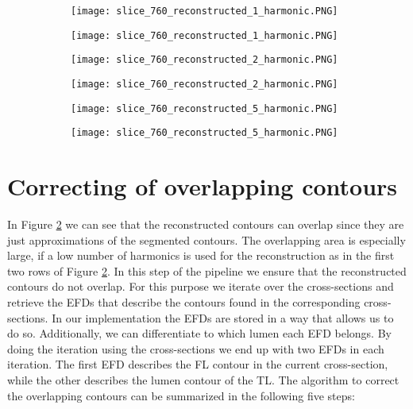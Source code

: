 \documentclass[thesis.tex]{subfiles}
\begin{document}
\begin{figure}
	\begin{subfigure}[t]{0.45\textwidth}
		\texttt{[image: slice\_760\_reconstructed\_1\_harmonic.PNG]}
	\caption{}
\label{fig:efds_reconstruction_a}		
	\end{subfigure}
\hspace{0.1\textwidth}
	\begin{subfigure}[t]{0.45\textwidth}
		\texttt{[image: slice\_760\_reconstructed\_1\_harmonic.PNG]}		
\caption{}	
	\end{subfigure}
	\begin{subfigure}[t]{0.45\textwidth}
		\texttt{[image: slice\_760\_reconstructed\_2\_harmonic.PNG]}
	\caption{}		
	\end{subfigure}
\hspace{0.1\textwidth}
	\begin{subfigure}[t]{0.45\textwidth}
		\texttt{[image: slice\_760\_reconstructed\_2\_harmonic.PNG]}		
\caption{}	
	\end{subfigure}
	\begin{subfigure}[t]{0.45\textwidth}
		\texttt{[image: slice\_760\_reconstructed\_5\_harmonic.PNG]}
	\caption{}		
	\end{subfigure}
\hspace{0.1\textwidth}
	\begin{subfigure}[t]{0.45\textwidth}
		\texttt{[image: slice\_760\_reconstructed\_5\_harmonic.PNG]}		
\caption{}	
	\end{subfigure}
	\caption{}

\label{fig:efds_reconstruction}
\end{figure}

\section{Correcting of overlapping contours}
In Figure \ref{fig:efds_reconstruction} we can see that the reconstructed contours can overlap since they are just approximations of the segmented contours. The overlapping area is especially large, if a low number of harmonics is used for the reconstruction as in the first two rows of Figure \ref{fig:efds_reconstruction}. In this step of the pipeline we ensure that the reconstructed contours do not overlap. For this purpose we iterate over the cross-sections and retrieve the EFDs that describe the contours found in the corresponding cross-sections. In our implementation the EFDs are stored in a way that allows us to do so. Additionally, we can differentiate to which lumen each EFD belongs. By doing the iteration using the cross-sections we end up with two EFDs in each iteration. The first EFD describes the FL contour in the current cross-section, while the other describes the lumen contour of the TL. 
The algorithm to correct the overlapping contours can be summarized in the following five steps:
\end{document}
